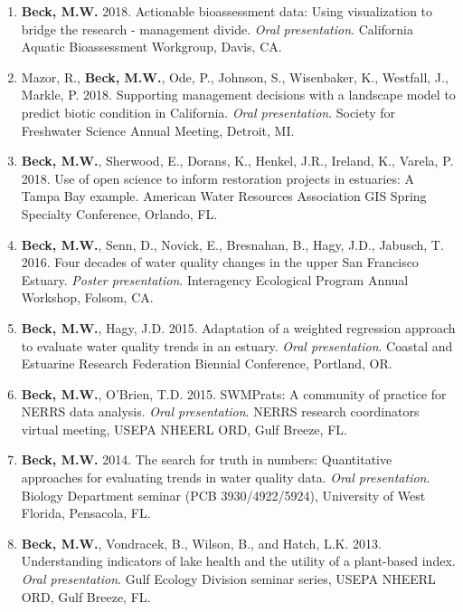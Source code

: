 \documentclass[letterpaper,12pt]{article}
\begin{document}
\begin{enumerate}

\item {\bf Beck, M.W.} 2018. Actionable bioassessment data: Using visualization to bridge the research - management divide. \textit{Oral presentation}. California Aquatic Bioassessment Workgroup, Davis, CA.

\item Mazor, R., {\bf Beck, M.W.}, Ode, P., Johnson, S., Wisenbaker, K., Westfall, J., Markle, P. 2018. Supporting management decisions with a landscape model to predict biotic condition in California. \textit{Oral presentation}. Society for Freshwater Science Annual Meeting, Detroit, MI.

\item {\bf Beck, M.W.}, Sherwood, E., Dorans, K., Henkel, J.R., Ireland, K., Varela, P. 2018. Use of open science to inform restoration projects in estuaries: A Tampa Bay example. American Water Resources Association GIS Spring Specialty Conference, Orlando, FL. 

\item {\bf Beck, M.W.}, Senn, D., Novick, E., Bresnahan, B., Hagy, J.D., Jabusch, T. 2016. Four decades of water quality changes in the upper San Francisco Estuary. \textit{Poster presentation}. Interagency Ecological Program Annual Workshop, Folsom, CA.

\item {\bf Beck, M.W.}, Hagy, J.D. 2015. Adaptation of a weighted regression approach to evaluate water quality trends in an estuary. \textit{Oral presentation}. Coastal and Estuarine Research Federation Biennial Conference, Portland, OR.

\item {\bf Beck, M.W.}, O'Brien, T.D. 2015. SWMPrats: A community of practice for NERRS data analysis. \textit{Oral presentation}. NERRS research coordinators virtual meeting, USEPA NHEERL ORD, Gulf Breeze, FL.

\item {\bf Beck, M.W.} 2014. The search for truth in numbers: Quantitative approaches for evaluating trends in water quality data. \textit{Oral presentation}. Biology Department seminar (PCB 3930/4922/5924), University of West Florida, Pensacola, FL. 

\item {\bf Beck, M.W.}, Vondracek, B., Wilson, B., and Hatch, L.K. 2013. Understanding indicators of lake health and the utility of a plant-based index. \textit{Oral presentation}. Gulf Ecology Division seminar series, USEPA NHEERL ORD, Gulf Breeze, FL.


\end{enumerate}
\end{document}
